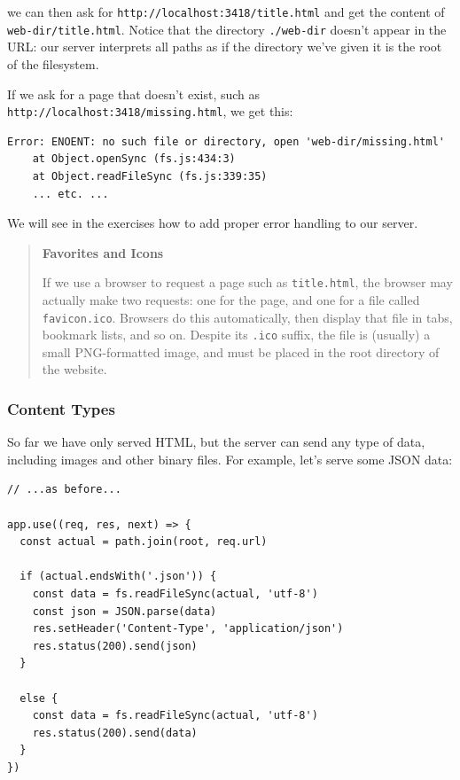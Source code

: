 we can then ask for \texttt{http://localhost:3418/title.html} and get
the content of \texttt{web-dir/title.html}. Notice that the directory
\texttt{./web-dir} doesn't appear in the URL: our server interprets all
paths as if the directory we've given it is the root of the filesystem.

If we ask for a page that doesn't exist, such as
\texttt{http://localhost:3418/missing.html}, we get this:

\begin{verbatim}
Error: ENOENT: no such file or directory, open 'web-dir/missing.html'
    at Object.openSync (fs.js:434:3)
    at Object.readFileSync (fs.js:339:35)
    ... etc. ...
\end{verbatim}

We will see in the exercises how to add proper error handling to our
server.

\begin{quote}
\textbf{Favorites and Icons}

If we use a browser to request a page such as \texttt{title.html}, the
browser may actually make two requests: one for the page, and one for a
file called \texttt{favicon.ico}. Browsers do this automatically, then
display that file in tabs, bookmark lists, and so on. Despite its
\texttt{.ico} suffix, the file is (usually) a small PNG-formatted image,
and must be placed in the root directory of the website.
\end{quote}

\subsubsection{Content Types}\label{s:server-content-types}

So far we have only served HTML, but the server can send any type of
data, including images and other binary files. For example, let's serve
some JSON data:

\begin{verbatim}
// ...as before...

app.use((req, res, next) => {
  const actual = path.join(root, req.url)

  if (actual.endsWith('.json')) {
    const data = fs.readFileSync(actual, 'utf-8')
    const json = JSON.parse(data)
    res.setHeader('Content-Type', 'application/json')
    res.status(200).send(json)
  }

  else {
    const data = fs.readFileSync(actual, 'utf-8')
    res.status(200).send(data)
  }
})
\end{verbatim}

